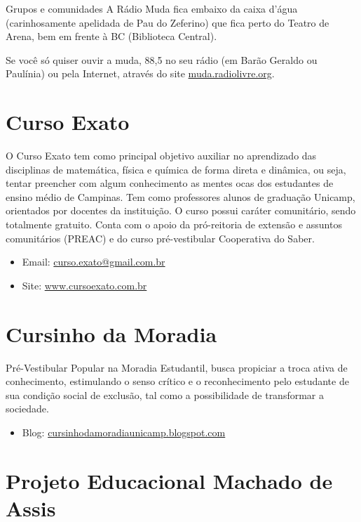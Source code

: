 \begin{story}{Grupos e comunidades}
A Rádio Muda fica embaixo da caixa d'água (carinhosamente apelidada de Pau do Zeferino) que fica perto do Teatro de Arena, bem em frente à BC (Biblioteca Central).

Se você só quiser ouvir a muda, 88,5 no seu rádio (em Barão Geraldo ou Paulínia) ou pela Internet, através do site \url{muda.radiolivre.org}.

\section*{Curso Exato}

O Curso Exato tem como principal objetivo auxiliar no aprendizado das disciplinas de matemática, física e química de forma direta e dinâmica, ou seja, tentar preencher com algum conhecimento as mentes ocas dos estudantes de ensino médio de Campinas. Tem como professores alunos de graduação Unicamp, orientados por docentes da instituição. O curso possui caráter comunitário, sendo totalmente gratuito. Conta com o apoio da pró-reitoria de extensão e assuntos comunitários (PREAC) e do curso pré-vestibular Cooperativa do Saber.

\begin{itemize}
\item Email: \url{curso.exato@gmail.com.br}
\item Site: \url{www.cursoexato.com.br}
\end{itemize}

\section*{Cursinho da Moradia}

Pré-Vestibular Popular na Moradia Estudantil, busca propiciar a troca ativa de conhecimento, estimulando o senso crítico e o reconhecimento pelo estudante de sua condição social de exclusão, tal como a possibilidade de transformar a sociedade.

\begin{itemize}
\item Blog: \url{cursinhodamoradiaunicamp.blogspot.com}
\end{itemize}

\section*{Projeto Educacional Machado de Assis}


\end{story}
